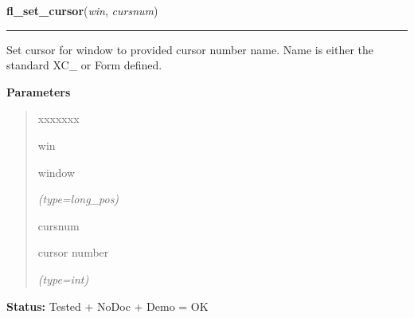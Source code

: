     \vspace{0.5ex}

\hspace{.8\funcindent}\begin{boxedminipage}{\funcwidth}

    \raggedright \textbf{fl\_set\_cursor}(\textit{win}, \textit{cursnum})

    \vspace{-1.5ex}

    \rule{\textwidth}{0.5\fboxrule}
\setlength{\parskip}{2ex}
    Set cursor for window to provided cursor number name. Name is either 
    the standard XC\_ or Form defined.

\setlength{\parskip}{1ex}
      \textbf{Parameters}
      \vspace{-1ex}

      \begin{quote}
        \begin{Ventry}{xxxxxxx}

          \item[win]

          window

            {\it (type=long\_pos)}

          \item[cursnum]

          cursor number

            {\it (type=int)}

        \end{Ventry}

      \end{quote}

\textbf{Status:} Tested + NoDoc + Demo = OK



    \end{boxedminipage}

    \label{xformslib:flcursor:fl_set_cursor_color}

    \vspace{0.5ex}

